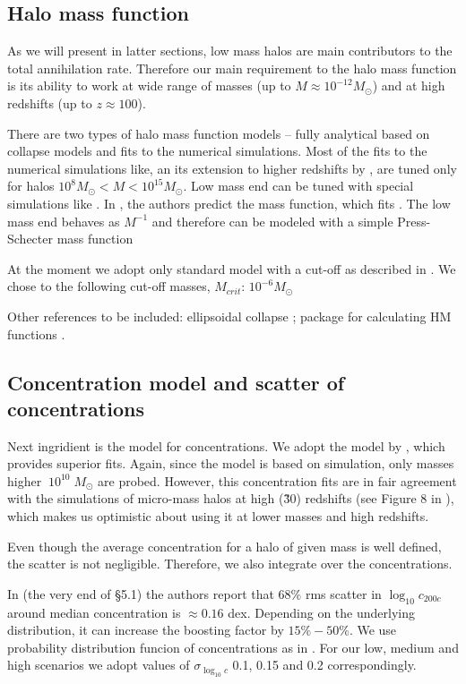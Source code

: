 \subsection{Halo mass function}

As we will present in latter sections, low mass halos are main contributors to the total annihilation rate. Therefore our main requirement to the halo mass function is its ability to work at wide range of masses (up to $M \approx 10^{-12}M_\odot$) and at high redshifts (up to $z \approx 100$). 

There are two types of halo mass function models -- fully analytical based on collapse models and fits to the numerical simulations. Most of the fits to the numerical simulations like, \citet{Tinker_2008} an its extension to higher redshifts by \citet{Behroozi_2013}, are tuned only for halos $10^{8}M_\odot < M < 10^{15}M_\odot$. Low mass end can be tuned with special simulations like \cite{Diemand_2005}. In \cite{Schneider_2013}, the authors predict the mass function, which fits \cite{Diemand_2005}. The low mass end behaves as $M^{-1}$ and therefore can be modeled with a simple Press-Schecter mass function \citep{Press_1974}

At the moment we adopt only standard \citet{Press_1974} model with a cut-off as described in \cite{Diemand_2005}. We chose to the following cut-off masses, $M_{crit}$: $10^{-6}M_\odot$

Other references to be included:
ellipsoidal collapse \citep{Sheth_2001}; package for calculating HM functions \cite{Murray_2013}.

\subsection{Concentration model and scatter of concentrations}

Next ingridient is the model for concentrations. We adopt the model by \cite{2014arXiv1407.4730D}, which provides superior fits. Again, since the model is based on simulation, only masses higher $~10^{10}\;M_\odot$ are probed. However, this concentration fits are in fair agreement with the simulations of micro-mass halos at high (\~30) redshifts (see Figure 8 in \cite{2014arXiv1407.4730D}), which makes us optimistic about using it at lower masses and high redshifts.

Even though the average concentration for a halo of given mass is well defined, the scatter is not negligible. Therefore, we also integrate over the concentrations.

In \cite{2014arXiv1407.4730D} (the very end of \S5.1) the authors report that 68\% rms scatter in $\log_{10}c_{200c}$ around median concentration is $\approx 0.16$ dex. Depending on the underlying distribution, it can increase the boosting factor by $15\%-50\%$. We use probability distribution funcion of concentrations as in \cite{2014arXiv1412.4308M}. For our low, medium and high scenarios we adopt values of $\sigma_{\log_{10} c}$ 0.1, 0.15 and 0.2 correspondingly.